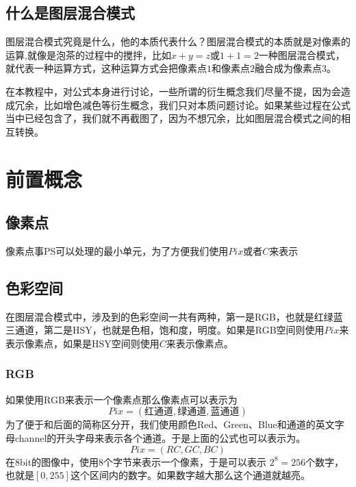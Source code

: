 \section{ 什么是图层混合模式}
\indent 图层混合模式究竟是什么，他的本质代表什么？图层混合模式的本质就是对像素的运算,就像是泡茶的过程中的搅拌，比如$x+y=z$或$1+1=2$一种图层混合模式，就代表一种运算方式，这种运算方式会把像素点$1$和像素点$2$融合成为像素点$3$。
\begin{notice}
\item 在本教程中，对公式本身进行讨论，一些所谓的衍生概念我们尽量不提，因为会造成冗余，比如增色减色等衍生概念，我们只对本质问题讨论。如果某些过程在公式当中已经包含了，我们就不再截图了，因为不想冗余，比如图层混合模式之间的相互转换。
\end{notice}
\chapter{ 前置概念}
\section{ 像素点}
\indent 像素点事PS可以处理的最小单元，为了方便我们使用$Pix$或者$C$来表示
\section{ 色彩空间}
\indent 在图层混合模式中，涉及到的色彩空间一共有两种，第一是RGB，也就是红绿蓝三通道，第二是HSY，也就是色相，饱和度，明度。如果是RGB空间则使用$Pix$来表示像素点，如果是HSY空间则使用$C$来表示像素点。
\subsection{ RGB}
如果使用RGB来表示一个像素点那么像素点可以表示为
\begin{equation} Pix=(\text{红通道},\text{绿通道},\text{蓝通道}) 
\end{equation}
\indent 为了便于和后面的简称区分开，我们使用颜色Red、Green、Blue和通道的英文字母channel的开头字母来表示各个通道。于是上面的公式也可以表示为。
\begin{equation}Pix= (RC,GC,BC)  
\end{equation}
\indent 在8bit的图像中，使用8个字节来表示一个像素，于是可以表示 $2^8=256 $个数字，也就是$[0,255] $这个区间内的数字。如果数字越大那么这个通道就越亮。

